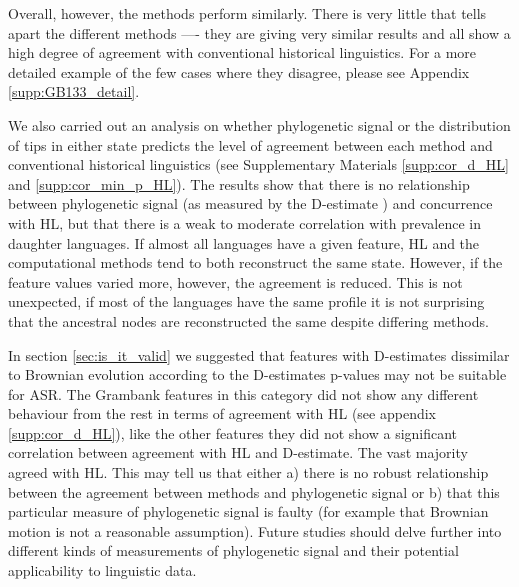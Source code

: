 \documentclass[12pt,letterpaper]{article}
\begin{document}
Overall, however, the methods perform similarly. There is very little that tells apart the different methods ---- they are giving very similar results and all show a high degree of agreement with conventional historical linguistics. For a more detailed example of the few cases where they disagree, please see Appendix \ref{supp:GB133_detail}.

We also carried out an analysis on whether phylogenetic signal \citep{fritz2010selectivity} or the distribution of tips in either state predicts the level of agreement between each method and conventional historical linguistics (see Supplementary Materials \ref{supp:cor_d_HL} and \ref{supp:cor_min_p_HL}). The results show that there is no relationship between phylogenetic signal (as measured by the D-estimate \citep{fritz2010selectivity}) and concurrence with HL, but that there is a weak to moderate correlation with prevalence in daughter languages. If almost all languages have a given feature, HL and the computational methods tend to both reconstruct the same state. However, if the feature values varied more, however, the agreement is reduced. This is not unexpected, if most of the languages have the same profile it is not surprising that the ancestral nodes are reconstructed the same despite differing methods.

In section \ref{sec:is_it_valid} we suggested that features with D-estimates dissimilar to Brownian evolution according to the D-estimates p-values may not be suitable for ASR. The Grambank features in this category did not show any different behaviour from the rest in terms of agreement with HL (see appendix \ref{supp:cor_d_HL}), like the other features they did not show a significant correlation between agreement with HL and D-estimate. The vast majority agreed with HL. This may tell us that either a) there is no robust relationship between the agreement between methods and phylogenetic signal or b) that this particular measure of phylogenetic signal is faulty (for example that Brownian motion is not a reasonable assumption). Future studies should delve further into different kinds of measurements of phylogenetic signal and their potential applicability to linguistic data.
\end{document}
